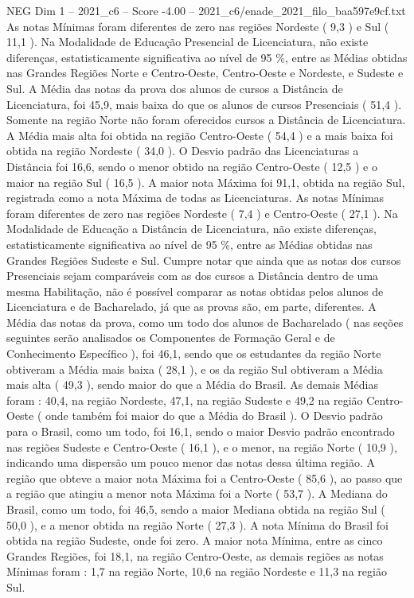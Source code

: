 \begin{textsample}{NEG Dim 1 – 2021\_c6 – Score -4.00 – 2021\_c6/enade\_2021\_filo\_baa597e9cf.txt}
As notas Mínimas foram diferentes de zero nas regiões Nordeste ( 9,3 ) e Sul ( 11,1 ).
Na Modalidade de Educação Presencial de Licenciatura, não existe diferenças, estatisticamente significativa ao nível de 95 \%, entre as Médias obtidas nas Grandes Regiões Norte e Centro-Oeste, Centro-Oeste e Nordeste, e Sudeste e Sul.
A Média das notas da prova dos alunos de cursos a Distância de Licenciatura, foi 45,9, mais baixa do que os alunos de cursos Presenciais ( 51,4 ).
Somente na região Norte não foram oferecidos cursos a Distância de Licenciatura.
A Média mais alta foi obtida na região Centro-Oeste ( 54,4 ) e a mais baixa foi obtida na região Nordeste ( 34,0 ).
O Desvio padrão das Licenciaturas a Distância foi 16,6, sendo o menor obtido na região Centro-Oeste ( 12,5 ) e o maior na região Sul ( 16,5 ).
A maior nota Máxima foi 91,1, obtida na região Sul, registrada como a nota Máxima de todas as Licenciaturas.
As notas Mínimas foram diferentes de zero nas regiões Nordeste ( 7,4 ) e Centro-Oeste ( 27,1 ).
Na Modalidade de Educação a Distância de Licenciatura, não existe diferenças, estatisticamente significativa ao nível de 95 \%, entre as Médias obtidas nas Grandes Regiões Sudeste e Sul.
Cumpre notar que ainda que as notas dos cursos Presenciais sejam comparáveis com as dos cursos a Distância dentro de uma mesma Habilitação, não é possível comparar as notas obtidas pelos alunos de Licenciatura e de Bacharelado, já que as provas são, em parte, diferentes.
A Média das notas da prova, como um todo dos alunos de Bacharelado ( nas seções seguintes serão analisados os Componentes de Formação Geral e de Conhecimento Específico ), foi 46,1, sendo que os estudantes da região Norte obtiveram a Média mais baixa ( 28,1 ), e os da região Sul obtiveram a Média mais alta ( 49,3 ), sendo maior do que a Média do Brasil.
As demais Médias foram : 40,4, na região Nordeste, 47,1, na região Sudeste e 49,2 na região Centro-Oeste ( onde também foi maior do que a Média do Brasil ).
O Desvio padrão para o Brasil, como um todo, foi 16,1, sendo o maior Desvio padrão encontrado nas regiões Sudeste e Centro-Oeste ( 16,1 ), e o menor, na região Norte ( 10,9 ), indicando uma dispersão um pouco menor das notas dessa última região.
A região que obteve a maior nota Máxima foi a Centro-Oeste ( 85,6 ), ao passo que a região que atingiu a menor nota Máxima foi a Norte ( 53,7 ).
A Mediana do Brasil, como um todo, foi 46,5, sendo a maior Mediana obtida na região Sul ( 50,0 ), e a menor obtida na região Norte ( 27,3 ).
A nota Mínima do Brasil foi obtida na região Sudeste, onde foi zero.
A maior nota Mínima, entre as cinco Grandes Regiões, foi 18,1, na região Centro-Oeste, as demais regiões as notas Mínimas foram : 1,7 na região Norte, 10,6 na região Nordeste e 11,3 na região Sul.

\end{textsample}
